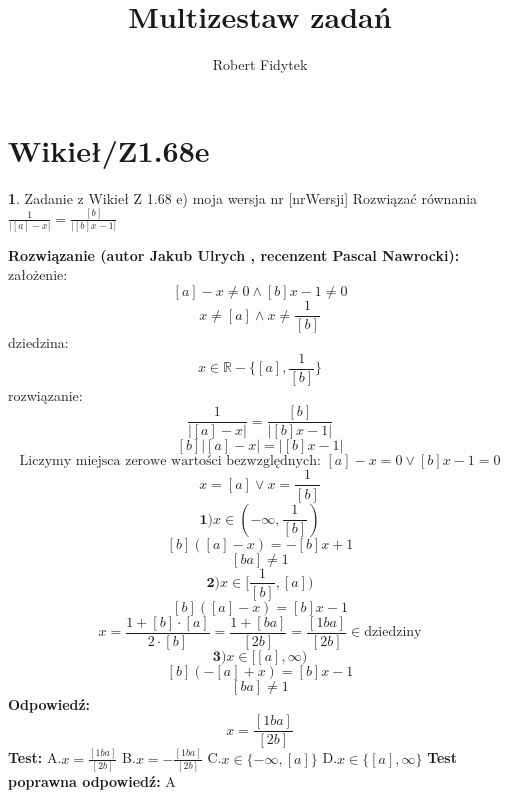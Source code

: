 \documentclass[12pt, a4paper]{article}
\title{Multizestaw zadań}
\author{Robert Fidytek}
\date{}
\theoremstyle{definition} %
\newtheorem{zad}{}
\newcommand{\kategoria}[1]{\section{#1}} %
\newcommand{\zadStart}[1]{\begin{zad}#1\newline} %
\newcommand{\zadStop}{\end{zad}}   %
\newcommand{\rozwStart}[2]{\noindent \textbf{Rozwiązanie (autor #1 , recenzent #2): }\newline} %
\newcommand{\rozwStop}{\newline}                                            %
\newcommand{\odpStart}{\noindent \textbf{Odpowiedź:}\newline}    %
\newcommand{\odpStop}{\newline}                                             %
\newcommand{\testStart}{\noindent \textbf{Test:}\newline} %
\newcommand{\testStop}{\newline} %
\newcommand{\kluczStart}{\noindent \textbf{Test poprawna odpowiedź:}\newline} %
\newcommand{\kluczStop}{\newline} %
\begin{document}
\maketitle


\kategoria{Wikieł/Z1.68e}
\zadStart{Zadanie z Wikieł Z 1.68 e) moja wersja nr [nrWersji]}
Rozwiązać równania $\frac{1}{|[a]-x|}=\frac{[b]}{|[b]x-1|}$
\zadStop
\rozwStart{Jakub Ulrych}{Pascal Nawrocki}
założenie:
$$[a]-x\neq0 \land [b]x-1\neq0$$
$$x\neq[a]\land x\neq\frac{1}{[b]}$$
dziedzina:$$x\in\mathbb{R}-\{[a],\frac{1}{[b]}\}$$
rozwiązanie:
$$\frac{1}{|[a]-x|}=\frac{[b]}{|[b]x-1|}$$
$$[b]|[a]-x|=|[b]x-1|$$
$$\text{Liczymy miejsca zerowe wartości bezwzględnych: }[a]-x=0\vee[b]x-1=0$$
$$x=[a]\vee x=\frac{1}{[b]}$$
$$\textbf{1)}x\in(-\infty,\frac{1}{[b]})$$
$$[b]([a]-x)=-[b]x+1$$
$$[ba]\neq1$$
$$\textbf{2)}x\in[\frac{1}{[b]},[a])$$
$$[b]([a]-x)=[b]x-1$$
$$x=\frac{1+[b]\cdot[a]}{2\cdot[b]}=\frac{1+[ba]}{[2b]}=\frac{[1ba]}{[2b]}\in\text{dziedziny}$$
$$\textbf{3)}x\in[[a],\infty)$$
$$[b](-[a]+x)=[b]x-1$$
$$[ba]\neq1$$
\rozwStop
\odpStart
$$x=\frac{[1ba]}{[2b]}$$
\odpStop
\testStart
A.$x=\frac{[1ba]}{[2b]}$
B.$x=-\frac{[1ba]}{[2b]}$
C.$x\in\{-\infty,[a]\}$
D.$x\in\{[a],\infty\}$
\testStop
\kluczStart
A
\kluczStop
\end{document}
